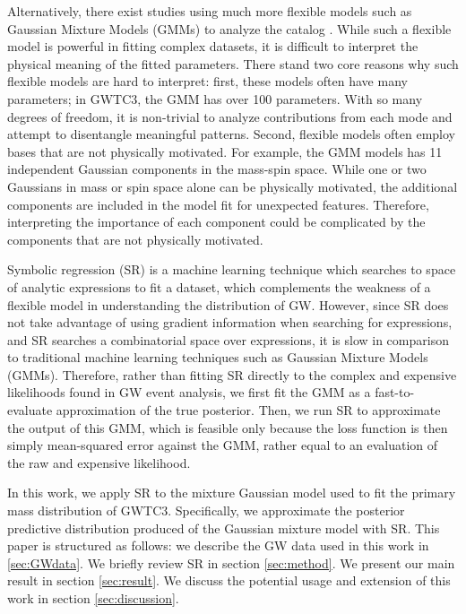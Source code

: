 \documentclass[nohyperref]{article}
\theoremstyle{plain}
\theoremstyle{definition}
\theoremstyle{remark}
\begin{document}
Alternatively, there exist studies using much more flexible models such as  Gaussian Mixture Models (GMMs) to analyze the catalog \cite{Tiwari:2020vym}.
While such a flexible model is powerful in fitting complex datasets,
it is difficult to interpret the physical meaning of the fitted parameters.
There stand two core reasons why such flexible models are hard to interpret:
first, these models often have many parameters;
in GWTC3, the GMM has over 100 parameters.
With so many degrees of freedom, it is non-trivial to analyze contributions from each mode and attempt to disentangle meaningful patterns.
Second, flexible models often employ bases that are not physically motivated.
For example, the GMM models has 11 independent Gaussian components in the mass-spin space.
While one or two Gaussians in mass or spin space alone can be physically motivated,
the additional components are included in the model fit for unexpected features.
Therefore, interpreting the importance of each component could be complicated by the components that are not physically motivated.

Symbolic regression (SR) is a machine learning technique which searches to space of analytic expressions to fit a dataset, which complements the weakness of a flexible model in understanding the distribution of GW.
However, since SR does not take advantage of using gradient information when searching for expressions,
and  SR searches a combinatorial space over expressions,
it is slow in comparison to traditional machine learning techniques such as Gaussian Mixture Models (GMMs).
Therefore, rather than fitting SR directly to the complex and expensive likelihoods found in GW event analysis, we first fit the GMM as a fast-to-evaluate approximation of the true posterior.
Then, we run SR to approximate the output of this GMM, which is feasible only because the loss function is then simply mean-squared error against the GMM, rather equal to an evaluation of the raw and expensive likelihood.

In this work, we apply SR to the mixture Gaussian model used to fit the primary mass distribution of GWTC3.
Specifically, we approximate the posterior predictive distribution produced of the Gaussian mixture model with SR.
This paper is structured as follows: we describe the GW data used in this work in \ref{sec:GWdata}.
We briefly review SR in section \ref{sec:method}.
We present our main result in section \ref{sec:result}.
We discuss the potential usage and extension of this work in section \ref{sec:discussion}.
\end{document}
